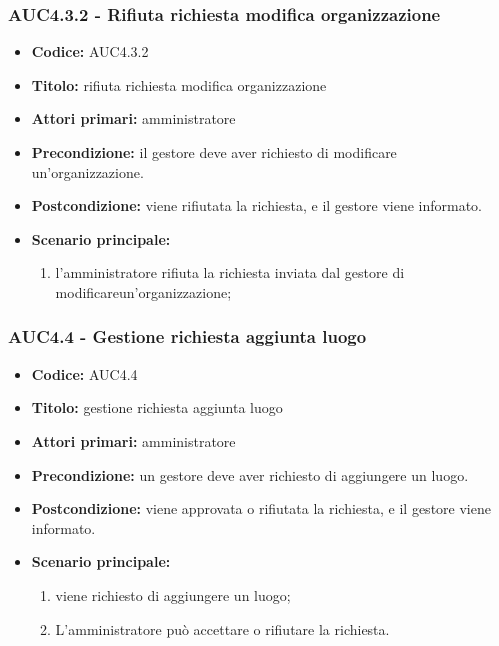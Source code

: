 \documentclass[casi-duso]{subfiles}
\begin{document}
\subsubsection{AUC4.3.2 - Rifiuta richiesta modifica organizzazione}%
\label{subsub:AUC4.3.2}
\begin{itemize}
  \item \textbf{Codice:} AUC4.3.2
  \item \textbf{Titolo:} rifiuta richiesta modifica organizzazione
  \item \textbf{Attori primari:} amministratore
  \item \textbf{Precondizione:} il gestore deve aver richiesto di modificare un'organizzazione.
  \item \textbf{Postcondizione:} viene rifiutata la richiesta, e il gestore viene informato.
  \item \textbf{Scenario principale:}
  \begin{enumerate}
    \item l'amministratore rifiuta la richiesta inviata dal gestore di modificareun'organizzazione;
  \end{enumerate}
\end{itemize}

\subsubsection{AUC4.4 - Gestione richiesta aggiunta luogo}%
\label{subsub:AUC4.4}
\begin{itemize}
  \item \textbf{Codice:} AUC4.4
  \item \textbf{Titolo:} gestione richiesta aggiunta luogo
  \item \textbf{Attori primari:} amministratore
  \item \textbf{Precondizione:} un gestore deve aver richiesto di aggiungere un luogo.
  \item \textbf{Postcondizione:} viene approvata o rifiutata la richiesta, e il gestore viene informato.
  \item \textbf{Scenario principale:}
  \begin{enumerate}
    \item viene richiesto di aggiungere un luogo;
    \item L'amministratore può accettare o rifiutare la richiesta.
  \end{enumerate}
\end{itemize}
\end{document}
